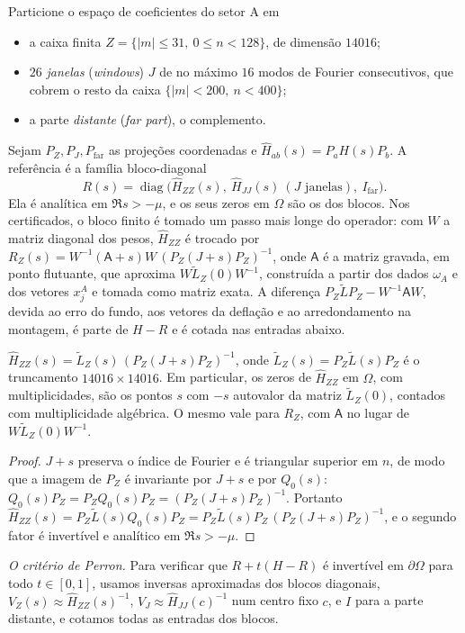 Particione o espaço de coeficientes do setor A em
\begin{itemize}[leftmargin=*]
\item a caixa finita $Z=\{|m|\le31,\ 0\le n<128\}$, de dimensão $14016$;
\item $26$ \emph{janelas} (\emph{windows}) $J$ de no máximo $16$ modos de Fourier consecutivos, que cobrem o resto da caixa
  $\{|m|<200,\ n<400\}$;
\item a parte \emph{distante} (\emph{far part}), o complemento.
\end{itemize}
Sejam $P_Z,P_J,P_{\mathrm{far}}$ as projeções coordenadas e $\widehat H_{ab}(s)=P_aH(s)P_b$. A referência é a
família bloco-diagonal
\[
  R(s)=\operatorname{diag}\big(\widehat H_{ZZ}(s),\ \widehat H_{JJ}(s)\ (J\text{ janelas}),\ I_{\mathrm{far}}\big).
\]
Ela é analítica em $\Re s>-\mu$, e os seus zeros em $\Omega$ são os dos blocos. Nos certificados, o bloco
finito é tomado um passo mais longe do operador: com $W$ a matriz diagonal dos pesos, $\widehat H_{ZZ}$ é
trocado por $R_Z(s)=W^{-1}(\mathsf A+s)W\,(P_Z(J+s)P_Z)^{-1}$, onde $\mathsf A$ é a matriz gravada, em ponto flutuante,
que aproxima $W\widetilde L_Z(0)W^{-1}$, construída a partir dos dados $\omega_A$ e dos vetores $x_j^A$ e tomada como
matriz exata. A diferença $P_Z\widetilde LP_Z-W^{-1}\mathsf AW$, devida ao erro do fundo, aos vetores da deflação e
ao arredondamento na montagem, é parte de $H-R$ e é cotada nas entradas abaixo.

\begin{lemma}\label{lem:ZZ}
$\widehat H_{ZZ}(s)=\widetilde L_Z(s)\,(P_Z(J+s)P_Z)^{-1}$, onde $\widetilde L_Z(s)=P_Z\widetilde L(s)P_Z$ é o
truncamento $14016\times14016$. Em particular, os zeros de $\widehat H_{ZZ}$ em $\Omega$, com multiplicidades, são
os pontos $s$ com $-s$ autovalor da matriz $\widetilde L_Z(0)$, contados com multiplicidade algébrica. O mesmo
vale para $R_Z$, com $\mathsf A$ no lugar de $W\widetilde L_Z(0)W^{-1}$.
\end{lemma}

\begin{proof}
$J+s$ preserva o índice de Fourier e é triangular superior em $n$, de modo que a imagem de $P_Z$ é invariante por
$J+s$ e por $Q_0(s)$: $Q_0(s)P_Z=P_ZQ_0(s)P_Z=(P_Z(J+s)P_Z)^{-1}$. Portanto
$\widehat H_{ZZ}(s)=P_Z\widetilde L(s)Q_0(s)P_Z=P_Z\widetilde L(s)P_Z\,(P_Z(J+s)P_Z)^{-1}$, e o segundo fator é
invertível e analítico em $\Re s>-\mu$.
\end{proof}

\emph{O critério de Perron.} Para verificar que $R+t(H-R)$ é invertível em $\partial\Omega$ para todo $t\in[0,1]$,
usamos inversas aproximadas dos blocos diagonais, $V_Z(s)\approx\widehat H_{ZZ}(s)^{-1}$, $V_J\approx\widehat
H_{JJ}(c)^{-1}$ num centro fixo $c$, e $I$ para a parte distante, e cotamos todas as entradas dos blocos.

